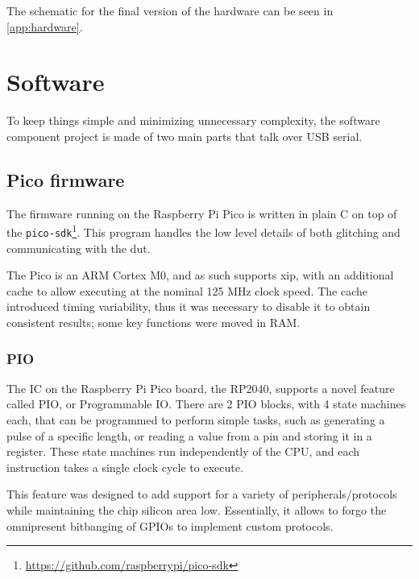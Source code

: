 \documentclass[a4paper,english,twoside,10pt]{article}
\begin{document}
The schematic for the final version of the hardware can be seen in \cref{app:hardware}.



\section{Software}\label{sect:software}
To keep things simple and minimizing unnecessary complexity, the software component project is made of two main parts that talk over USB serial.

\subsection{Pico firmware}
The firmware running on the Raspberry Pi Pico is written in plain C on top of the \texttt{pico-sdk}\footnote{\url{https://github.com/raspberrypi/pico-sdk}}. This program handles the low level details of both glitching and communicating with the \gls{dut}.

The Pico is an ARM Cortex M0, and as such supports \gls{xip}, with an additional cache to allow executing at the nominal 125 MHz clock speed. The cache introduced timing variability, thus it was necessary to disable it to obtain consistent results; some key functions were moved in RAM.

\subsubsection{PIO}
The IC on the Raspberry Pi Pico board, the RP2040, supports a novel feature called PIO, or Programmable IO. There are 2 PIO blocks, with 4 state machines each, that can be programmed to perform simple tasks, such as generating a pulse of a specific length, or reading a value from a pin and storing it in a register. These state machines run independently of the CPU, and each instruction takes a single clock cycle to execute.

This feature was designed to add support for a variety of peripherals/protocols while maintaining the chip silicon area low. Essentially, it allows to forgo the omnipresent bitbanging of GPIOs to implement custom protocols.
\end{document}
